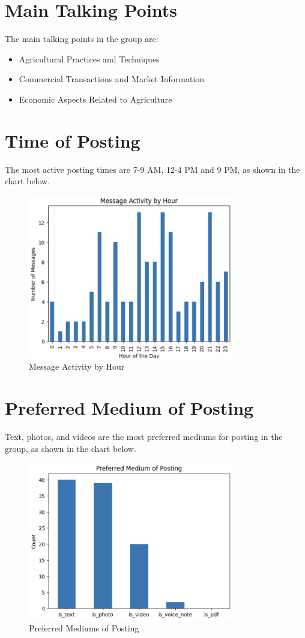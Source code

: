 \documentclass[12pt]{article}
\begin{document}
\section{Main Talking Points}
The main talking points in the group are:
\begin{itemize}
  \item Agricultural Practices and Techniques
  \item Commercial Transactions and Market Information
  \item Economic Aspects Related to Agriculture
\end{itemize}

\section{Time of Posting}
The most active posting times are 7-9 AM, 12-4 PM and 9 PM, as shown in the chart below.
\begin{figure}[H]
\centering
\includegraphics[width=0.8\textwidth]{img/posting_times.png}
\caption{Message Activity by Hour}
\end{figure}

\section{Preferred Medium of Posting}
Text, photos, and videos are the most preferred mediums for posting in the group, as shown in the chart below.
\begin{figure}[H]
\centering
\includegraphics[width=0.8\textwidth]{img/medium_preference.png}
\caption{Preferred Mediums of Posting}
\end{figure}
\end{document}
